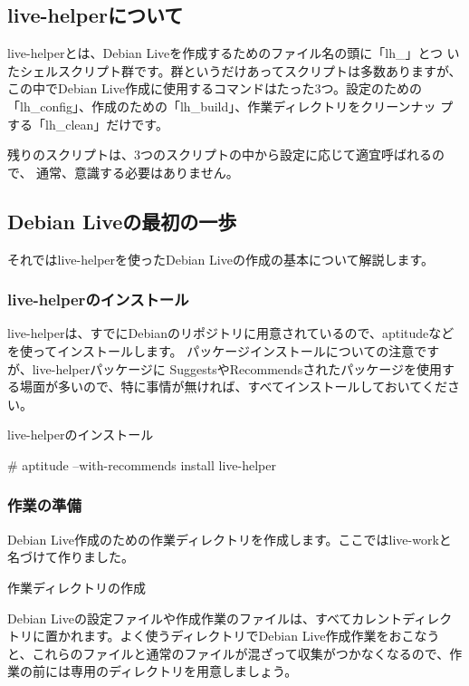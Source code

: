 \documentclass[mingoth,a4paper]{jsarticle}
\begin{document}
\subsection{live-helperについて}
live-helperとは、Debian Liveを作成するためのファイル名の頭に「lh\_」とつ
いたシェルスクリプト群です。群というだけあってスクリプトは多数ありますが、
この中でDebian Live作成に使用するコマンドはたった3つ。設定のための
「lh\_config」、作成のための「lh\_build」、作業ディレクトリをクリーンナッ
プする「lh\_clean」だけです。

残りのスクリプトは、3つのスクリプトの中から設定に応じて適宜呼ばれるので、
通常、意識する必要はありません。

\subsection{Debian Liveの最初の一歩}
それではlive-helperを使ったDebian Liveの作成の基本について解説します。

\subsubsection{live-helperのインストール}
live-helperは、すでにDebianのリポジトリに用意されているので、aptitudeなどを使ってインストールします。
パッケージインストールについての注意ですが、live-helperパッケージに
SuggestsやRecommendsされたパッケージを使用する場面が多いので、特に事情が無ければ、すべてインストールしておいてください。

live-helperのインストール
\begin{commandline}
# aptitude --with-recommends install live-helper
\end{commandline}

\subsubsection{作業の準備}
Debian Live作成のための作業ディレクトリを作成します。ここではlive-workと名づけて作りました。

 作業ディレクトリの作成

Debian Liveの設定ファイルや作成作業のファイルは、すべてカレントディレクトリに置かれます。よく使うディレクトリでDebian Live作成作業をおこなうと、これらのファイルと通常のファイルが混ざって収集がつかなくなるので、作業の前には専用のディレクトリを用意しましょう。
\end{document}
